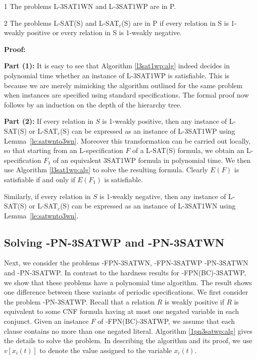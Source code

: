 \morespacing

\begin{theorem}\label{th:h3sat1wneasy}
\begin{description}
\item{1}
The problems L-3SAT1WN and L-3SAT1WP are in P. 
\item{2}
The problems L-SAT(S) and L-SAT$_c$(S) are in P if every relation in S is
1-weakly positive or every relation in S is 1-weakly negative.
\end{description}
\end{theorem}



\noindent
{\bf Proof:}

\noindent
{\bf Part (1):} 
It is easy to see that Algorithm \ref{l3sat1wp:alg} indeed decides
in polynomial time whether an instance of {\sf L-3SAT1WP} is satisfiable. This
is because we are merely mimicking the algorithm outlined for the same problem
when instances are specified using standard specifications. The formal proof
now follows by an induction on the depth of the hierarchy tree.



\noindent
{\bf Part (2):}  
If every relation in $S$ is 1-weakly positive, then any instance of 
{\sf L-SAT(S)} or {\sf L-SAT$_c$(S)} can be expressed as an instance of 
{\sf L-3SAT1WP} using 
Lemma~\ref{le:satwnto3wn}. Moreover this transformation can be carried out
locally, so that starting from an {\sf L}-specification $F$ 
of a {\sf L-SAT(S)} 
formula, we obtain an {\sf L}-specification $F_1$ of an equivalent 
{\sf 3SAT1WP} formula in polynomial time.
We then use Algorithm \ref{l3sat1wp:alg} to solve the resulting formula.
Clearly $E(F)$ is satisfiable if and only if $E(F_1)$ is satisfiable.

Similarly, if every relation in $S$ is 1-weakly negative, 
then any instance of {\sf L-SAT(S)} or {\sf L-SAT$_c$(S)} 
can be expressed as an instance of {\sf L-3SAT1WN} using 
Lemma~\ref{le:satwnto3wn}.\QED




\subsection{Solving {-PN-3SATWP} and  {-PN-3SATWN}}
Next, we consider the problems {-FPN-3SATWN}, {-FPN-3SATWP}
{-PN-3SATWN} and  {-PN-3SATWP}. In contrast to the hardness results
for {-FPN(BC)-3SATWP}, we show that
these problems have a polynomial
time algorithm. The result shows one difference between these variants
of periodic specifications. We first consider the problem {-PN-3SATWP}.
Recall that a relation $R$ is weakly positive if $R$ is equivalent to some
{\sf CNF} formula having at most one negated variable in each conjunct. 
Given an instance $F$ of {-FPN(BC)-3SATWP}, we assume that each clause
contains no more than one negated literal. Algorithm \ref{1pn3satwp:alg}
gives the details to solve the problem. In describing the algorithm and its
proof, we use $v[x_i(t)]$ to denote the value assigned to the variable 
$x_i(t)$.

